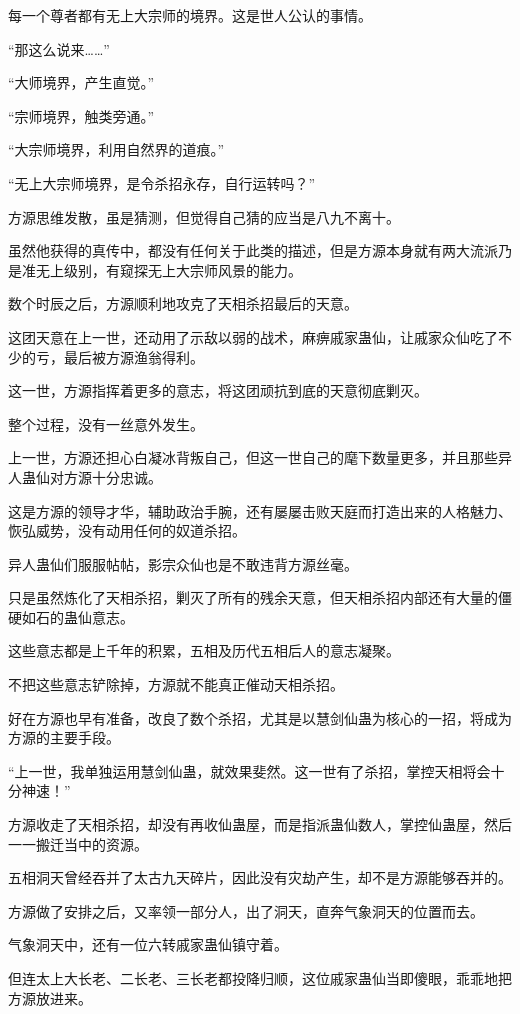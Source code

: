 \begin{this_body}
每一个尊者都有无上大宗师的境界。这是世人公认的事情。

“那这么说来……”

“大师境界，产生直觉。”

“宗师境界，触类旁通。”

“大宗师境界，利用自然界的道痕。”

“无上大宗师境界，是令杀招永存，自行运转吗？”

方源思维发散，虽是猜测，但觉得自己猜的应当是八九不离十。

虽然他获得的真传中，都没有任何关于此类的描述，但是方源本身就有两大流派乃是准无上级别，有窥探无上大宗师风景的能力。

数个时辰之后，方源顺利地攻克了天相杀招最后的天意。

这团天意在上一世，还动用了示敌以弱的战术，麻痹戚家蛊仙，让戚家众仙吃了不少的亏，最后被方源渔翁得利。

这一世，方源指挥着更多的意志，将这团顽抗到底的天意彻底剿灭。

整个过程，没有一丝意外发生。

上一世，方源还担心白凝冰背叛自己，但这一世自己的麾下数量更多，并且那些异人蛊仙对方源十分忠诚。

这是方源的领导才华，辅助政治手腕，还有屡屡击败天庭而打造出来的人格魅力、恢弘威势，没有动用任何的奴道杀招。

异人蛊仙们服服帖帖，影宗众仙也是不敢违背方源丝毫。

只是虽然炼化了天相杀招，剿灭了所有的残余天意，但天相杀招内部还有大量的僵硬如石的蛊仙意志。

这些意志都是上千年的积累，五相及历代五相后人的意志凝聚。

不把这些意志铲除掉，方源就不能真正催动天相杀招。

好在方源也早有准备，改良了数个杀招，尤其是以慧剑仙蛊为核心的一招，将成为方源的主要手段。

“上一世，我单独运用慧剑仙蛊，就效果斐然。这一世有了杀招，掌控天相将会十分神速！”

方源收走了天相杀招，却没有再收仙蛊屋，而是指派蛊仙数人，掌控仙蛊屋，然后一一搬迁当中的资源。

五相洞天曾经吞并了太古九天碎片，因此没有灾劫产生，却不是方源能够吞并的。

方源做了安排之后，又率领一部分人，出了洞天，直奔气象洞天的位置而去。

气象洞天中，还有一位六转戚家蛊仙镇守着。

但连太上大长老、二长老、三长老都投降归顺，这位戚家蛊仙当即傻眼，乖乖地把方源放进来。


\end{this_body}
